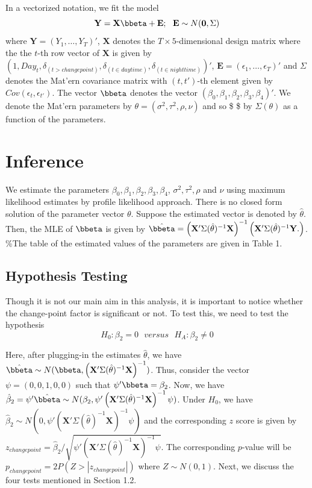 \documentclass[]{article}
\begin{document}
In a vectorized notation, we fit the model
\[\mathbf{Y} = \mathbf{X} \bbeta + \mathbf{E}; ~~ \mathbf{E} \sim N(\mathbf{0}, \Sigma)\]
where \(\mathbf{Y} = (Y_1, \ldots, Y_T)'\), \(\mathbf{X}\) denotes the \(T\times 5\)-dimensional design matrix where the the \(t\)-th row vector of \(\mathbf{X}\) is given by \((1, Day_t, \delta_{(t > changepoint)}, \delta_{(t \in daytime)}, \delta_{(t \in nighttime)})'\), \(\mathbf{E} = (\epsilon_1, \ldots, \epsilon_T)'\) and \(\Sigma\) denotes the Mat'ern covariance matrix with \((t,t')\)-th element given by \(Cov(\epsilon_t, \epsilon_{t'})\). The vector \(\bbeta\) denotes the vector \((\beta_0, \beta_1, \beta_2, \beta_3, \beta_4)'\). We denote the Mat'ern parameters by \(\theta = (\sigma^2, \tau^2, \rho, \nu)\) and so \$ \Sigma\$ by \(\Sigma(\theta)\) as a function of the parameters.

\section{Inference}\label{s:inference}

We estimate the parameters \(\beta_0,\beta_1, \beta_2,\beta_3, \beta_4\), \(\sigma^2,\tau^2,\rho\) and \(\nu\) using maximum likelihood estimates by profile likelihood approach. There is no closed form solution of the parameter vector \(\theta\). Suppose the estimated vector is denoted by \(\hat{\theta}\). Then, the MLE of \(\bbeta\) is given by
\(\hat{\bbeta} = \left(\mathbf{X}' \Sigma(\hat{\theta})^{-1} \mathbf{X} \right)^{-1} \left(\mathbf{X}' \Sigma(\hat{\theta})^{-1} \mathbf{Y}. \right)\). \%The table of the estimated values of the parameters are given in Table 1.

\subsection{Hypothesis Testing}

Though it is not our main aim in this analysis, it is important to notice whether the change-point factor is significant or not. To test this, we need to test the hypothesis \[H_0: \beta_2 = 0 ~~~ versus~~~ H_A: \beta_2 \neq 0\]

Here, after plugging-in the estimates \(\hat{\theta}\), we have \(\hat{\bbeta} \sim N(\bbeta, \left(\mathbf{X}' \Sigma(\hat{\theta})^{-1} \mathbf{X} \right)^{-1})\). Thus, consider the vector \(\psi = (0, 0, 1, 0, 0)\) such that \(\psi' \bbeta = \beta_2\). Now, we have \(\hat{\beta}_2 = \psi'\hat{\bbeta} \sim N(\beta_2, \psi' \left(\mathbf{X}' \Sigma(\hat{\theta})^{-1} \mathbf{X} \right)^{-1} \psi)\). Under \(H_0\), we have \(\hat{\beta}_2 \sim N(0, \psi' \left(\mathbf{X}' \Sigma(\hat{\theta})^{-1} \mathbf{X} \right)^{-1} \psi)\) and the corresponding \(z\) score is given by \(z_{changepoint} = \hat{\beta}_2 / \sqrt{\psi' \left(\mathbf{X}' \Sigma(\hat{\theta})^{-1} \mathbf{X} \right)^{-1} \psi}\). The corresponding \(p\)-value will be \(p_{changepoint} = 2P(Z > |z_{changepoint}|)\) where \(Z \sim N(0, 1)\). Next, we discuss the four tests mentioned in Section 1.2.
\end{document}
